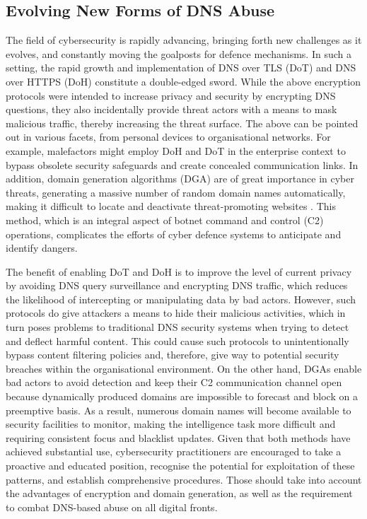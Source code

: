 \subsection{Evolving New Forms of DNS Abuse}


The field of cybersecurity is rapidly advancing, bringing forth new challenges as it evolves, and constantly moving the goalposts for defence mechanisms. In such a setting, the rapid growth and implementation of DNS over TLS (DoT) and DNS over HTTPS (DoH) constitute a double-edged sword. While the above encryption protocols were intended to increase privacy and security by encrypting DNS questions, they also incidentally provide threat actors with a means to mask malicious traffic, thereby increasing the threat surface. The above can be pointed out in various facets, from personal devices to organisational networks. For example, malefactors might employ DoH and DoT in the enterprise context to bypass obsolete security safeguards and create concealed communication links. In addition, domain generation algorithms (DGA) are of great importance in cyber threats, generating a massive number of random domain names automatically, making it difficult to locate and deactivate threat-promoting websites \cite{kaur2023artificial}. This method, which is an integral aspect of botnet command and control (C2) operations, complicates the efforts of cyber defence systems to anticipate and identify dangers.

The benefit of enabling DoT and DoH is to improve the level of current privacy by avoiding DNS query surveillance and encrypting DNS traffic, which reduces the likelihood of intercepting or manipulating data by bad actors. However, such protocols do give attackers a means to hide their malicious activities, which in turn poses problems to traditional DNS security systems when trying to detect and deflect harmful content. This could cause such protocols to unintentionally bypass content filtering policies and, therefore, give way to potential security breaches within the organisational environment. On the other hand, DGAs enable bad actors to avoid detection and keep their C2 communication channel open because dynamically produced domains are impossible to forecast and block on a preemptive basis. As a result, numerous domain names will become available to security facilities to monitor, making the intelligence task more difficult and requiring consistent focus and blacklist updates. Given that both methods have achieved substantial use, cybersecurity practitioners are encouraged to take a proactive and educated position, recognise the potential for exploitation of these patterns, and establish comprehensive procedures. Those should take into account the advantages of encryption and domain generation, as well as the requirement to combat DNS-based abuse on all digital fronts.





